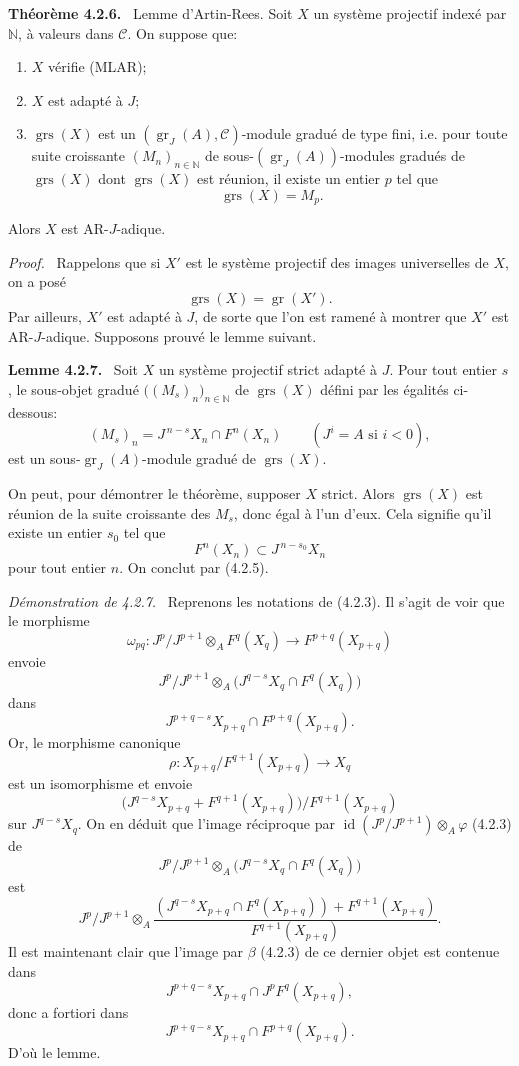 \documentclass[11pt]{article}
\newenvironment{statement}[1]{\par\medskip\noindent\textbf{#1.}\ }{\par\medskip}
\newenvironment{prooftext}[1][Proof]{\par\noindent\emph{#1.}\ }{\par\medskip}
\providecommand{\gr}{\operatorname{gr}}
\providecommand{\id}{\operatorname{id}}
\providecommand{\id}{\operatorname{id}}
\providecommand{\gr}{\operatorname{gr}}
\providecommand{\gr}{\operatorname{gr}}
\providecommand{\grs}{\operatorname{grs}}
\providecommand{\id}{\operatorname{id}}
\providecommand{\id}{\operatorname{id}}
\providecommand{\id}{\operatorname{id}}
\providecommand{\id}{\operatorname{id}}
\begin{document}
\begin{statement}{Théorème 4.2.6}
Lemme d'Artin-Rees. Soit \(X\) un système projectif indexé par \(\mathbb N\), à valeurs dans \(\mathcal C\). On suppose que:
\begin{enumerate}[label=\textup{(\roman*)}]
\item \(X\) vérifie (MLAR);
\item \(X\) est adapté à \(J\);
\item \(\grs(X)\) est un \((\gr_J(A),\mathcal C)\)-module gradué de type fini, i.e. pour toute suite croissante \((M_n)_{n\in\mathbb N}\) de sous-\((\gr_J(A))\)-modules gradués de \(\grs(X)\) dont \(\grs(X)\) est réunion, il existe un entier \(p\) tel que
\[
\grs(X)=M_p.
\]
\end{enumerate}
Alors \(X\) est AR-\(J\)-adique.
\end{statement}

\begin{prooftext}
Rappelons que si \(X'\) est le système projectif des images universelles de \(X\), on a posé
\[
\grs(X)=\gr(X').
\]
Par ailleurs, \(X'\) est adapté à \(J\), de sorte que l'on est ramené à montrer que \(X'\) est AR-\(J\)-adique. Supposons prouvé le lemme suivant.
\end{prooftext}

\begin{statement}{Lemme 4.2.7}
Soit \(X\) un système projectif strict adapté à \(J\). Pour tout entier \(s\), le sous-objet gradué \(\bigl((M_s)_n\bigr)_{n\in\mathbb N}\) de \(\grs(X)\) défini par les égalités ci-dessous:
\[
(M_s)_n=J^{\,n-s}X_n\cap F^n(X_n)\qquad(J^i=A\text{ si }i<0),
\]
est un sous-\(\gr_J(A)\)-module gradué de \(\grs(X)\).
\end{statement}

On peut, pour démontrer le théorème, supposer \(X\) strict. Alors \(\grs(X)\) est réunion de la suite croissante des \(M_s\), donc égal à l'un d'eux. Cela signifie qu'il existe un entier \(s_0\) tel que
\[
F^n(X_n)\subset J^{\,n-s_0}X_n
\]
pour tout entier \(n\). On conclut par (4.2.5).

\begin{prooftext}[Démonstration de 4.2.7]
Reprenons les notations de (4.2.3). Il s'agit de voir que le morphisme
\[
\omega_{pq}:J^p/J^{p+1}\otimes_A F^q(X_q)\longrightarrow F^{p+q}(X_{p+q})
\]
envoie
\[
J^p/J^{p+1}\otimes_A
\bigl(J^{q-s}X_q\cap F^q(X_q)\bigr)
\]
dans
\[
J^{p+q-s}X_{p+q}\cap F^{p+q}(X_{p+q}).
\]
Or, le morphisme canonique
\[
\rho:X_{p+q}/F^{q+1}(X_{p+q})\longrightarrow X_q
\]
est un isomorphisme et envoie
\[
\bigl(J^{q-s}X_{p+q}+F^{q+1}(X_{p+q})\bigr)/F^{q+1}(X_{p+q})
\]
sur \(J^{q-s}X_q\). On en déduit que l'image réciproque par
\(\id(J^p/J^{p+1})\otimes_A\varphi\) (4.2.3) de
\[
J^p/J^{p+1}\otimes_A
\bigl(J^{q-s}X_q\cap F^q(X_q)\bigr)
\]
est
\[
J^p/J^{p+1}\otimes_A
\frac{(J^{q-s}X_{p+q}\cap F^q(X_{p+q}))+F^{q+1}(X_{p+q})}
     {F^{q+1}(X_{p+q})}.
\]
Il est maintenant clair que l'image par \(\beta\) (4.2.3) de ce dernier objet est contenue dans
\[
J^{p+q-s}X_{p+q}\cap J^pF^q(X_{p+q}),
\]
donc a fortiori dans
\[
J^{p+q-s}X_{p+q}\cap F^{p+q}(X_{p+q}).
\]
D'où le lemme.
\end{prooftext}
\end{document}
